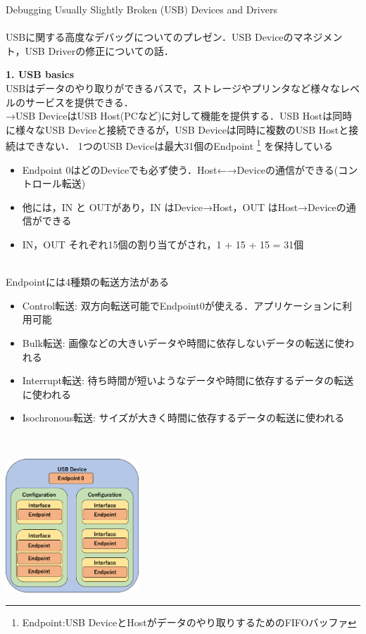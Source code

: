 \documentclass[10pt]{jreport}
\begin{document}
{\LARGE Debugging Usually Slightly Broken (USB) Devices and Drivers}\\\\
USBに関する高度なデバッグについてのプレゼン．USB Deviceのマネジメント，USB Driverの修正についての話．

\begin{description}
  \item {\large \textbf{1. USB basics}}\mbox{}\\
  USBはデータのやり取りができるバスで，ストレージやプリンタなど様々なレベルのサービスを提供できる．\\
  →USB DeviceはUSB Host(PCなど)に対して機能を提供する．USB Hostは同時に様々なUSB Deviceと接続できるが，USB Deviceは同時に複数のUSB Hostと接続はできない．
  1つのUSB Deviceは最大31個のEndpoint
  \footnote[1]{Endpoint:USB DeviceとHostがデータのやり取りするためのFIFOバッファ}
  を保持している
  \begin{itemize}
    \item Endpoint 0はどのDeviceでも必ず使う．Host←→Deviceの通信ができる(コントロール転送)
    \item 他には，IN と OUTがあり，IN はDevice→Host，OUT はHost→Deviceの通信ができる
    \item IN，OUT それぞれ15個の割り当てがされ，1 + 15 + 15 = 31個
    \end{itemize}\\
    Endpointには4種類の転送方法がある
    \begin{itemize}
      \item Control転送:     双方向転送可能でEndpoint0が使える．アプリケーションに利用可能
      \item Bulk転送:        画像などの大きいデータや時間に依存しないデータの転送に使われる
      \item Interrupt転送:   待ち時間が短いようなデータや時間に依存するデータの転送に使われる
      \item Isochronous転送: サイズが大きく時間に依存するデータの転送に使われる
      \end{itemize}\\
      \begin{center}
        \includegraphics[width=5cm]{img/USB-1.png} \\

\end{center}
\end{description}
\end{document}

